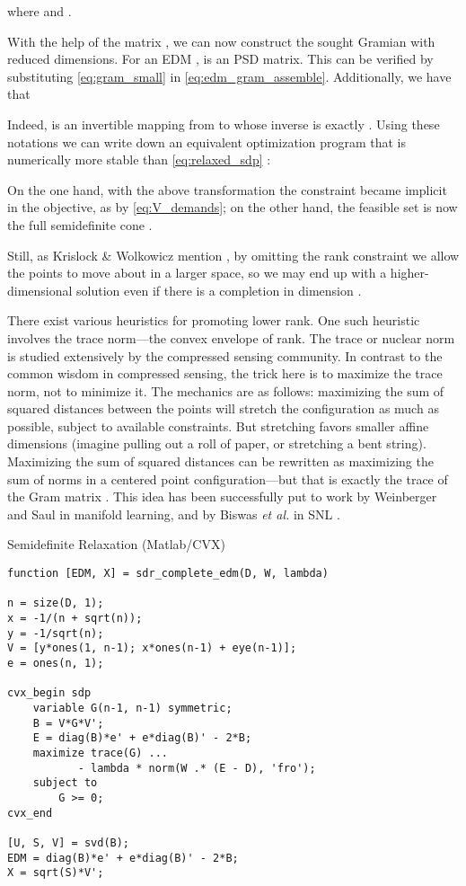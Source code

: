 \documentclass[10pt,double]{IEEEtran}
\newcommand{\rev}[1]{{#1}}
\begin{document}
where  and .

\rev{With the help of the matrix , we can now construct the sought Gramian
with reduced dimensions.} For an EDM ,
 is an  PSD matrix. This
can be verified by substituting \eqref{eq:gram_small} in
\eqref{eq:edm_gram_assemble}. Additionally, we have that

Indeed,   is an invertible mapping from
 to  whose inverse is exactly . Using
these notations we can write down an equivalent optimization program that is
numerically more stable than \eqref{eq:relaxed_sdp} \cite{Alfakih1999}:


On the one hand, with the above transformation the constraint  became implicit in the objective, as  by \eqref{eq:V_demands}; on the other hand, the feasible set is
now the full semidefinite cone .

Still, as Krislock \& Wolkowicz mention \cite{Krislock:2012xx}, by omitting
the rank constraint we allow the points to move about in a larger space, so we
may end up with a higher-dimensional solution even if there is a completion in
dimension .

There exist various heuristics for promoting lower rank. One such heuristic
involves the trace norm---the convex envelope of rank. The trace or nuclear
norm is studied extensively by the compressed sensing community. In contrast
to the common wisdom in compressed sensing, the trick here is to maximize the
trace norm, not to minimize it. The mechanics are as follows: maximizing the
sum of squared distances between the points will stretch the configuration as
much as possible, subject to available constraints. But stretching favors
smaller affine dimensions (imagine pulling out a roll of paper, or stretching
a bent string). Maximizing the sum of squared distances can be rewritten as
maximizing the sum of norms in a centered point configuration---but that is
exactly the trace of the Gram matrix  \cite{Weinberger2004}. This idea has been successfully put to
work by Weinberger and Saul \cite{Weinberger2004} in manifold learning, and by
Biswas \emph{et al.} in SNL \cite{Biswas:2006cm}.

\begin{algorithm}[t]
\caption{{Semidefinite Relaxation (Matlab/CVX)}}
\vspace{-5mm}
\begin{lstlisting}
function [EDM, X] = sdr_complete_edm(D, W, lambda)

n = size(D, 1);
x = -1/(n + sqrt(n));
y = -1/sqrt(n);
V = [y*ones(1, n-1); x*ones(n-1) + eye(n-1)];
e = ones(n, 1);

cvx_begin sdp
    variable G(n-1, n-1) symmetric;
    B = V*G*V';
    E = diag(B)*e' + e*diag(B)' - 2*B;
    maximize trace(G) ...
           - lambda * norm(W .* (E - D), 'fro');
    subject to
        G >= 0;
cvx_end

[U, S, V] = svd(B);
EDM = diag(B)*e' + e*diag(B)' - 2*B;
X = sqrt(S)*V';
\end{lstlisting}
\label{alg:SDR_matlab}
\end{algorithm}
\end{document}
